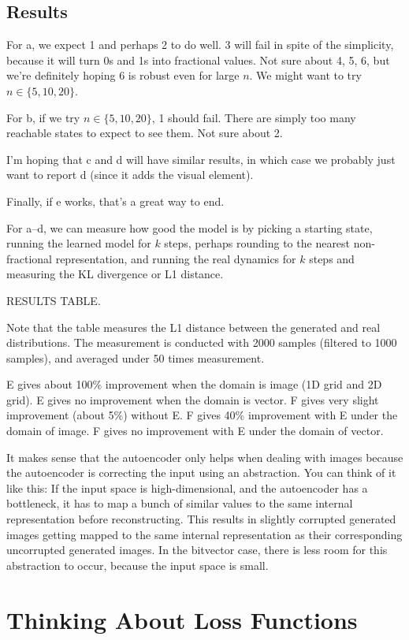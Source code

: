 \documentclass[letterpaper]{article} %
\begin{document}
\subsection{Results}

For a, we expect 1 and perhaps 2 to do well. 3 will fail in spite of the simplicity, because it will turn 0s and 1s into fractional values. Not sure about 4, 5, 6, but we're definitely hoping 6 is robust even for large $n$. We might want to try $n \in \{5, 10, 20\}$.

For b, if we try $n \in \{5,10,20\}$, 1 should fail. There are simply too many reachable states to expect to see them. Not sure about 2.

I'm hoping that c and d will have similar results, in which case we probably just want to report d (since it adds the visual element).

Finally, if e works, that's a great way to end.

For a--d, we can measure how good the model is by picking a starting state, running the learned model for $k$ steps, perhaps rounding to the nearest non-fractional representation, and running the real dynamics for $k$ steps and measuring the KL divergence or L1 distance.

RESULTS TABLE.

Note that the table measures the L1 distance between the generated and real distributions. The measurement is conducted with 2000 samples (filtered to 1000 samples), and averaged under 50 times measurement.

E gives about 100\% improvement when the domain is image (1D grid and 2D grid).
E gives no improvement when the domain is vector. F gives very slight improvement (about 5\%) without E. F gives 40\% improvement with E under the domain of image. F gives no improvement with E under the domain of vector.

It makes sense that the autoencoder only helps when dealing with images because the autoencoder is correcting the input using an abstraction. You can think of it like this: If the input space is high-dimensional, and the autoencoder has a bottleneck, it has to map a bunch of similar values to the same internal representation before reconstructing. This results in slightly corrupted generated images getting mapped to the same internal representation as their corresponding uncorrupted generated images. In the bitvector case, there is less room for this abstraction to occur, because the input space is small.

\section{Thinking About Loss Functions}
\end{document}
